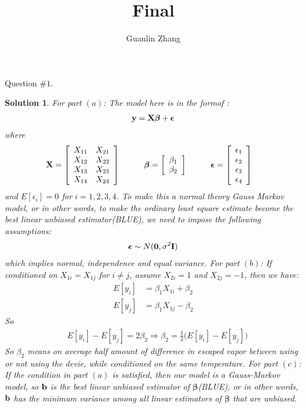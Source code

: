 \documentclass[11pt]{article}
\title{Final}
\author{Guanlin Zhang}
\newtheorem{sol}{Solution}
\begin{document}
Question $\# 1$.
\begin{sol}
	For part $(a)$:\vskip 2mm
	The model here is in the formof :
	\begin{align*}
		{\bf y} = {\bf X}{\bm \beta} + {\bm \epsilon}
	\end{align*}
	where
	\begin{align*}
		{\bf X} &= \left[\begin{array}{cc} X_{11}& X_{21}\\ X_{12}& X_{22}\\ X_{13} &X_{23}\\ X_{14}&X_{24}\end{array}\right] \hskip 1cm {\bm \beta} = \left[\begin{array}{c}\beta_1\\ \beta_2 \end{array}\right] \hskip 1cm {\bm \epsilon} = \left[\begin{array}{c} \epsilon_1\\ \epsilon_2 \\ \epsilon_3 \\ \epsilon_4\end{array}\right]
	\end{align*}
	and $E[\epsilon_i] = 0$ for $i = 1, 2, 3, 4$.\vskip 2mm
	To make this a normal theory Gauss Markov model, or in other words, to make the ordinary least square estimate become the best linear unbiased estimator(BLUE), we need to impose the following assumptions:
	\begin{align*}
		{\bm \epsilon} \sim N({\bf 0}, \sigma^2{\bf I})
	\end{align*}
	which implies normal, independence and equal variance.
	\vskip 2mm
	For part $(b)$:\vskip 2mm
	If conditioned on $X_{1i} = X_{1j}$ for $i \neq j$, assume $X_{2i} = 1$ and $X_{2j} = -1$, then we have:
	\begin{align*}
		E[y_{i}] &= \beta_1X_{1i}+\beta_2\\
		E[y_{j}] &= \beta_1X_{1j} -\beta_2
	\end{align*}
	So
	\begin{align*}
		&\ E[y_{i}] - E[y_{j}] = 2\beta_2 \Longrightarrow \beta_2 = \frac{1}{2}\Big(E[y_i] - E[y_j]\Big)
	\end{align*}
	So $\beta_2$ means on average half amount of difference in escaped vapor between using or not using the devie, while conditioned on the same temperature.\vskip 2mm
	For part $(c)$:\vskip 2mm
	If the condition in part $(a)$ is satisfied, then our model is a Gauss-Markov model, so ${\bf b}$ is the best linear unbiased estimator of ${\bm \beta}$(BLUE), or in other words, ${\bf b}$ has the minimum variance among all linear estimators of ${\bm \beta}$ that are unbiased.\vskip 2mm

\end{sol}
\end{document}
